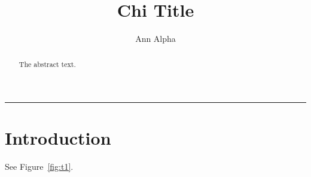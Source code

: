 \documentclass[sigchi-a,nonacm]{acmart}
\begin{document}
\title{Chi Title}
\author{Ann Alpha}
\begin{abstract}
The abstract text.
\end{abstract}
\begin{teaserfigure}
\centering\rule{2cm}{1cm}
\caption{Chi teaser}\label{fig:t1}
\end{teaserfigure}
\maketitle
\section{Introduction}
See Figure~\ref{fig:t1}.
\end{document}
